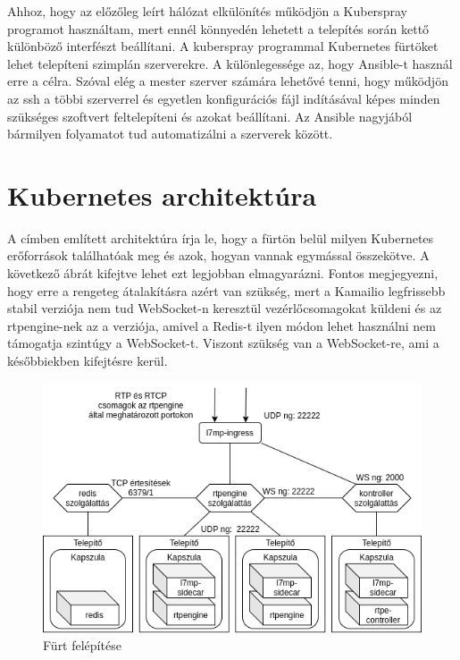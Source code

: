 Ahhoz, hogy az előzőleg leírt hálózat elkülönítés működjön a Kuberspray programot 
használtam, mert ennél könnyedén lehetett a telepítés során kettő különböző interfészt
beállítani. A kuberspray \cite{kubespray} programmal Kubernetes fürtöket lehet telepíteni szimplán
szerverekre. A különlegessége az, hogy Ansible-t használ erre a célra. Szóval elég
a mester szerver számára lehetővé tenni, hogy működjön az ssh a többi szerverrel és
egyetlen konfigurációs fájl indításával képes minden szükséges szoftvert feltelepíteni
és azokat beállítani. Az Ansible \cite{ansible} nagyjából bármilyen folyamatot tud automatizálni a
szerverek között. 

\section{Kubernetes architektúra}

A címben említett architektúra írja le, hogy a fürtön belül milyen Kubernetes
erőforrások találhatóak meg és azok, hogyan vannak egymással összekötve. A következő
ábrát kifejtve lehet ezt legjobban elmagyarázni. Fontos megjegyezni, hogy erre 
a rengeteg átalakításra azért van szükség, mert a Kamailio legfrissebb
stabil verziója nem tud WebSocket-n keresztül vezérlőcsomagokat küldeni és az rtpengine-nek
az a verziója, amivel a Redis-t ilyen módon lehet használni nem támogatja szintúgy
a WebSocket-t. Viszont szükség van a WebSocket-re, ami a későbbiekben kifejtésre kerül.

\begin{figure}[!ht]
	\centering
	\includegraphics[width=1\textwidth, keepaspectratio]{figures/cluster.png}
	\caption{Fürt felépítése}
	\label{fig:HVSpaces}
\end{figure}

